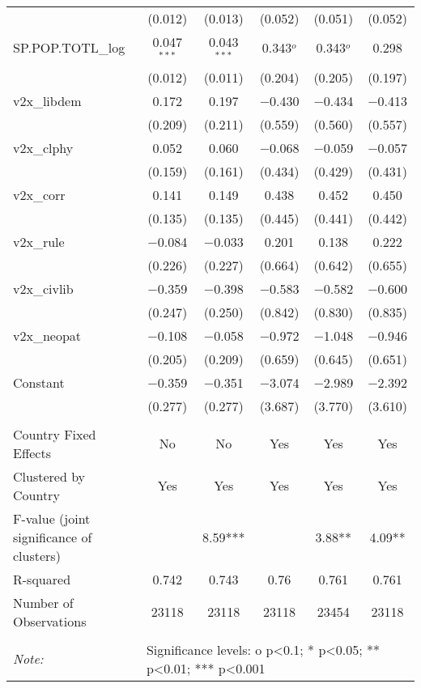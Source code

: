 \begin{tabular}{@{\extracolsep{5pt}}lccccc}
  & (0.012) & (0.013) & (0.052) & (0.051) & (0.052) \\ 
  SP.POP.TOTL\_log & 0.047$^{***}$ & 0.043$^{***}$ & 0.343$^{o}$ & 0.343$^{o}$ & 0.298 \\ 
  & (0.012) & (0.011) & (0.204) & (0.205) & (0.197) \\ 
  v2x\_libdem & 0.172 & 0.197 & $-$0.430 & $-$0.434 & $-$0.413 \\ 
  & (0.209) & (0.211) & (0.559) & (0.560) & (0.557) \\ 
  v2x\_clphy & 0.052 & 0.060 & $-$0.068 & $-$0.059 & $-$0.057 \\ 
  & (0.159) & (0.161) & (0.434) & (0.429) & (0.431) \\ 
  v2x\_corr & 0.141 & 0.149 & 0.438 & 0.452 & 0.450 \\ 
  & (0.135) & (0.135) & (0.445) & (0.441) & (0.442) \\ 
  v2x\_rule & $-$0.084 & $-$0.033 & 0.201 & 0.138 & 0.222 \\ 
  & (0.226) & (0.227) & (0.664) & (0.642) & (0.655) \\ 
  v2x\_civlib & $-$0.359 & $-$0.398 & $-$0.583 & $-$0.582 & $-$0.600 \\ 
  & (0.247) & (0.250) & (0.842) & (0.830) & (0.835) \\ 
  v2x\_neopat & $-$0.108 & $-$0.058 & $-$0.972 & $-$1.048 & $-$0.946 \\ 
  & (0.205) & (0.209) & (0.659) & (0.645) & (0.651) \\ 
  Constant & $-$0.359 & $-$0.351 & $-$3.074 & $-$2.989 & $-$2.392 \\ 
  & (0.277) & (0.277) & (3.687) & (3.770) & (3.610) \\ 
 \hline \\[-1.8ex] 
Country Fixed Effects & No & No & Yes & Yes & Yes \\ 
Clustered by Country & Yes & Yes & Yes & Yes & Yes \\ 
F-value (joint significance of clusters) &  & 8.59*** &  & 3.88** & 4.09** \\ 
R-squared & 0.742 & 0.743 & 0.76 & 0.761 & 0.761 \\ 
Number of Observations & 23118 & 23118 & 23118 & 23454 & 23118 \\ 
\hline 
\hline \\[-1.8ex] 
\textit{Note:}  & \multicolumn{5}{l}{Significance levels: o p<0.1; * p<0.05; ** p<0.01; *** p<0.001} \\ 
\end{tabular} 
